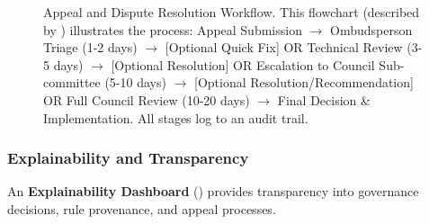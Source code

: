 \documentclass[manuscript,screen,review,anonymous,9pt]{acmart}
\begin{document}
\begin{figure}[htbp]
  \centering
  \caption[Appeal and dispute resolution workflow diagram]{Appeal and Dispute Resolution Workflow. This flowchart (described by ) illustrates the process: Appeal Submission $\rightarrow$ Ombudsperson Triage (1-2 days) $\rightarrow$ [Optional Quick Fix] OR Technical Review (3-5 days) $\rightarrow$ [Optional Resolution] OR Escalation to Council Sub-committee (5-10 days) $\rightarrow$ [Optional Resolution/Recommendation] OR Full Council Review (10-20 days) $\rightarrow$ Final Decision \& Implementation. All stages log to an audit trail.}
  \label{fig:appeal_workflow}
\end{figure}

\subsubsection{Explainability and Transparency}
An \textbf{Explainability Dashboard} () provides transparency into governance decisions, rule provenance, and appeal processes.
\end{document}
